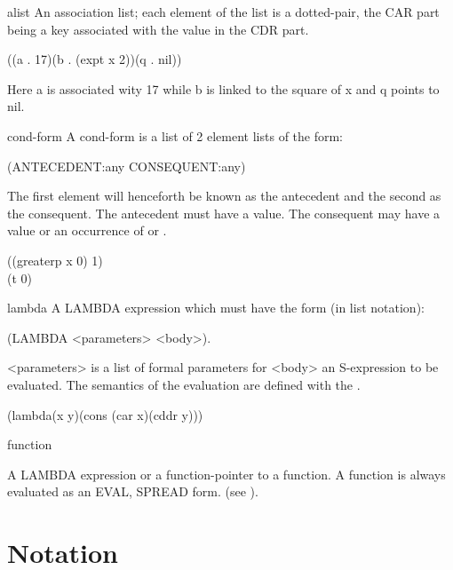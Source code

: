 \begin{Concept}{alist}
An  association   list;   each  element  of   the  list  is   a
     dotted-pair, the CAR part being a key associated  with the value
     in the CDR part.
\begin{Examples}
((a . 17)(b . (expt x 2))(q . nil))\\
\end{Examples}
Here a is associated wity 17 while b is linked to the square of x
and q points to nil. 
\end{Concept}

\begin{Concept}{cond-form}
 A cond-form is a list of 2 element lists of the form:

     (ANTECEDENT:any CONSEQUENT:any)

     The  first element will  henceforth be known  as the  antecedent
     and the  second as the consequent.   The antecedent must have  a
     value.   The consequent may have a value or an occurrence of 
      or .
\begin{Examples}
((greaterp x 0) 1)\\
(t 0)\\ 
\end{Examples}
\end{Concept}

\begin{Concept}{lambda}
A  LAMBDA  expression  which  must  have  the  form  (in  list
     notation): 

  (LAMBDA  <parameters>  <body>).  

<parameters>  is  a
     list  of formal parameters  for <body> an  S-expression to  be
     evaluated.   The  semantics of the  evaluation are defined  with
     the  .
\begin{Examples}
  (lambda(x y)(cons (car x)(cddr y))) 
\end{Examples}
\end{Concept}

\begin{Concept}{function}

 A LAMBDA expression or a function-pointer to a function.   A
     function is always evaluated as an EVAL, SPREAD form.
(see ).
\end{Concept}



\section{Notation}

